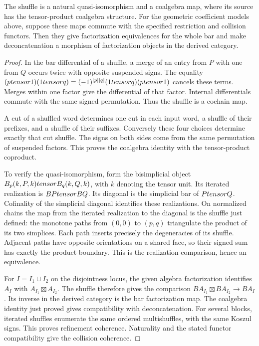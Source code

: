 \begin{proposition}
The shuffle is a natural quasi-isomorphism and a coalgebra map,
where its source has the tensor-product coalgebra structure.
For the geometric coefficient models above, suppose these maps commute with the specified
restriction and collision functors.
Then they give factorization equivalences for the whole bar and make
deconcatenation a morphism of factorization objects in the derived category.
\end{proposition}
\begin{proof}
In the bar differential of a shuffle, a merge of an entry from $P$ with one from $Q$
occurs twice with opposite suspended signs.
The equality $(ptensor1)(1tensor q)=(-1)^{|p||q|}(1tensor q)(ptensor1)$ cancels these terms.
Merges within one factor give the differential of that factor.
Internal differentials commute with the same signed permutation.
Thus the shuffle is a cochain map.

A cut of a shuffled word determines one cut in each input word,
a shuffle of their prefixes, and a shuffle of their suffixes.
Conversely these four choices determine exactly that cut shuffle.
The signs on both sides come from the same permutation of suspended factors.
This proves the coalgebra identity with the tensor-product coproduct.

To verify the quasi-isomorphism, form the bisimplicial object
$B_p(k,P,k)tensor B_q(k,Q,k)$, with $k$ denoting the tensor unit.
Its iterated realization is $BPtensor BQ$.
Its diagonal is the simplicial bar of $Ptensor Q$.
Cofinality of the simplicial diagonal identifies these realizations.
On normalized chains the map from the iterated realization to the diagonal
is the shuffle just defined: the monotone paths from $(0,0)$ to $(p,q)$
triangulate the product of its two simplices.
Each path inserts precisely the degeneracies of its shuffle.
Adjacent paths have opposite orientations on a shared face,
so their signed sum has exactly the product boundary.
This is the realization comparison, hence an equivalence.

For $I=I_1\sqcup I_2$ on the disjointness locus, the given algebra factorization
identifies $A_I$ with $A_{I_1}\boxtimes A_{I_2}$.
The shuffle therefore gives the comparison
$BA_{I_1}\boxtimes BA_{I_2}\to BA_I$.
Its inverse in the derived category is the bar factorization map.
The coalgebra identity just proved gives compatibility with deconcatenation.
For several blocks, iterated shuffles enumerate the same ordered multishuffles,
with the same Koszul signs. This proves refinement coherence.
Naturality and the stated functor compatibility give the collision coherence.
\end{proof}

